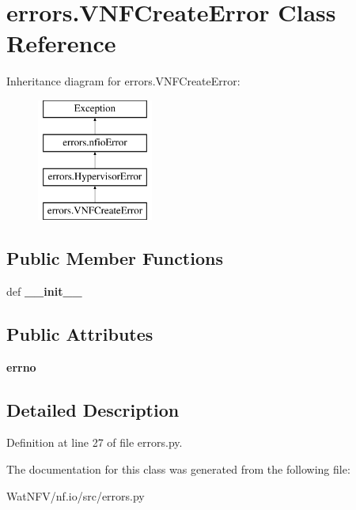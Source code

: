 \hypertarget{classerrors_1_1VNFCreateError}{\section{errors.\-V\-N\-F\-Create\-Error Class Reference}
\label{classerrors_1_1VNFCreateError}
}
Inheritance diagram for errors.\-V\-N\-F\-Create\-Error\-:\begin{figure}[H]
\begin{center}
\leavevmode
\includegraphics[height=4.000000cm]{classerrors_1_1VNFCreateError}
\end{center}
\end{figure}
\subsection*{Public Member Functions}
\begin{DoxyCompactItemize}
\item 
\hypertarget{classerrors_1_1VNFCreateError_ab23a6006da644303d74177322b2dda27}{def {\bfseries \-\_\-\-\_\-init\-\_\-\-\_\-}}\label{classerrors_1_1VNFCreateError_ab23a6006da644303d74177322b2dda27}

\end{DoxyCompactItemize}
\subsection*{Public Attributes}
\begin{DoxyCompactItemize}
\item 
\hypertarget{classerrors_1_1VNFCreateError_ae18f480a2baf26f11e0b7c37db441930}{{\bfseries errno}}\label{classerrors_1_1VNFCreateError_ae18f480a2baf26f11e0b7c37db441930}

\end{DoxyCompactItemize}


\subsection{Detailed Description}


Definition at line 27 of file errors.\-py.



The documentation for this class was generated from the following file\-:\begin{DoxyCompactItemize}
\item 
Wat\-N\-F\-V/nf.\-io/src/errors.\-py\end{DoxyCompactItemize}

